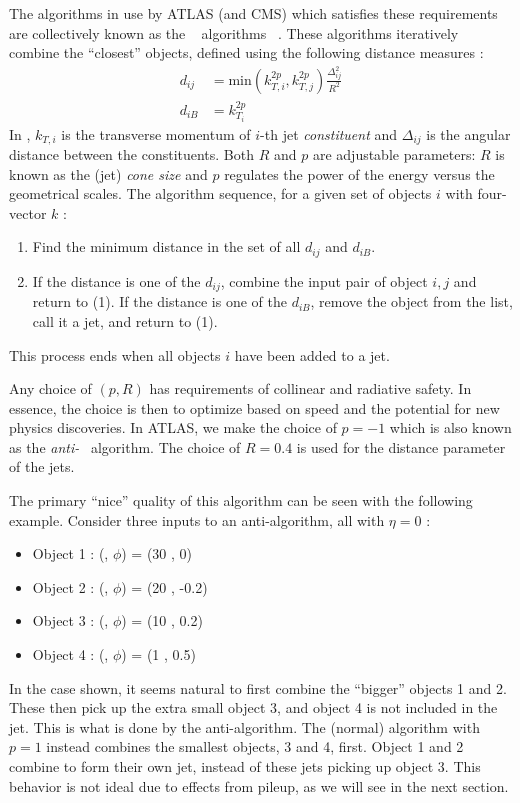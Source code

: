 The algorithms in use by ATLAS (and CMS) which satisfies these requirements are collectively known as the \kt~ algorithms ~\cite{Ellis:1993tq,Cacciari:2005hq,Cacciari:2008gp}.
These algorithms iteratively combine the ``closest'' objects, defined using the following distance measures :
\begin{equation}
\begin{aligned}\label{eq:kt}
d_{ij} &= \text{min}(k_{T,i}^{2p} , k_{T,j}^{2p} )  \frac{\Delta_{ij}^2 }{R^2} \\
d_{iB} &= k_{T_i}^{2p}
\end{aligned}
\end{equation}
In , $k_{T,i}$ is the transverse momentum of $i$-th jet \textit{constituent} and $\Delta_{ij}$ is the angular distance \deltaR between the constituents.
Both $R$ and $p$ are adjustable parameters: $R$ is known as the (jet) \textit{cone size} and $p$ regulates the power of the energy versus the geometrical scales.
The algorithm sequence, for a given set of objects $i$ with four-vector $k$ :
\begin{enumerate}
\item Find the minimum distance in the set of all $d_{ij}$ and $d_{iB}$.
\item If the distance is one of the $d_{ij}$, combine the input pair of object $i,j$ and return to (1).
If the distance is one of the $d_{iB}$, remove the object from the list, call it a jet, and return to (1).
\end{enumerate}
This process ends when all objects $i$ have been added to a jet.

Any choice of $(p,R)$ has requirements of collinear and radiative safety.
In essence, the choice is then to optimize based on speed and the potential for new physics discoveries.
In ATLAS, we make the choice of $p = -1$ which is also known as the \textit{anti-}\kt~ algorithm.
The choice of $R = 0.4$ is used for the distance parameter of the jets.

The primary ``nice'' quality of this algorithm can be seen with the following example.
Consider three inputs to an anti-\kt algorithm, all with $\eta = 0$ :
\begin{itemize}
\item Object 1 : (\pt, $\phi$) = (30 \GeV, 0)
\item Object 2 : (\pt, $\phi$) = (20 \GeV, -0.2)
\item Object 3 : (\pt, $\phi$) = (10 \GeV, 0.2)
\item Object 4 : (\pt, $\phi$) = (1  \GeV, 0.5)
\end{itemize}
In the case shown, it seems natural to first combine the ``bigger'' objects 1 and 2.
These then pick up the extra small object 3, and object 4 is not included in the jet.
This is what is done by the anti-\kt algorithm.
The (normal) \kt algorithm with $p = 1$ instead combines the smallest objects, 3 and 4, first.
Object 1 and 2 combine to form their own jet, instead of these jets picking up object 3.
This behavior is not ideal due to effects from pileup, as we will see in the next section.

